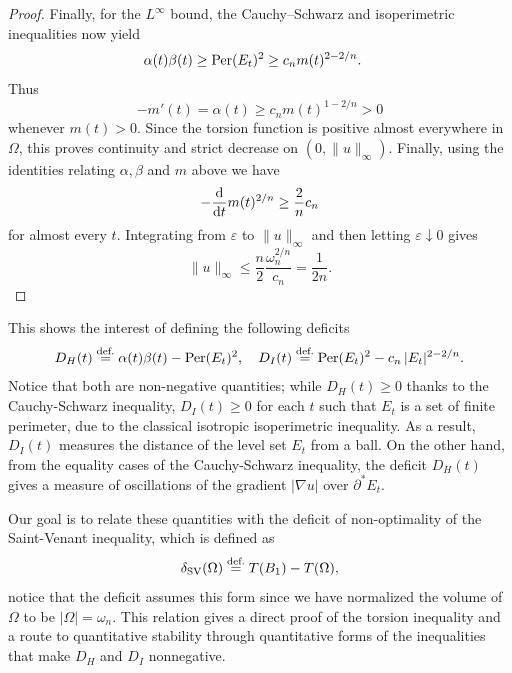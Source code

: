 \documentclass[11pt]{amsart}
\theoremstyle{plain}
\theoremstyle{definition}
\newcommand{\eqdef}{\overset{\text{def.}}{=}}
\def\dd{{\rm d}}
\newcommand\Per{\mathop{\rm Per}}
\newcommand\SV{\mathop{\rm SV}}
\begin{document}
\begin{proof}
Finally, for the $L^\infty$ bound, the Cauchy--Schwarz and isoperimetric inequalities now yield
\begin{align*}
  \alpha(t)\beta(t)
  &
  \ge\Per(E_t)^2
  \ge c_n m(t)^{2-2/n}.
\end{align*}
Thus
\[
  -m'(t)=\alpha(t)\ge c_n m(t)^{1-2/n}>0
\]
whenever $m(t)>0$. Since the torsion function is positive almost everywhere
in $\Omega$, this proves continuity and strict decrease on
$(0,\|u\|_\infty)$. Finally, using the identities relating $\alpha, \beta$ and $m$ above we have
\[
  -\frac{\dd}{\dd t}m(t)^{2/n}\ge\frac{2}{n} c_n
\]
for almost every $t$. Integrating from $\varepsilon$ to
$\|u\|_\infty$ and then letting $\varepsilon\downarrow0$ gives
\[
  \|u\|_\infty\le\frac{n}{2}\frac{\omega_n^{2/n}}{c_n}=\frac{1}{2n}.
\]
\end{proof}

This shows the interest of defining the following deficits
\begin{align}\label{eq.deficits_DH_DI}
  D_H(t)\eqdef \alpha(t)\beta(t)-\Per(E_t)^2,
  \quad
  D_I(t)\eqdef \Per(E_t)^2-c_n\,|E_t|^{2-2/n}.
\end{align}
Notice that both are non-negative quantities; while $D_H(t) \ge 0$ thanks to the Cauchy-Schwarz inequality, $D_I(t) \ge 0$ for each $t$ such that $E_t$ is a set of finite perimeter, due to the classical isotropic isoperimetric inequality. As a result, $D_I(t)$ measures the distance of the level set $E_t$ from a ball. On the other hand, from the equality cases of the Cauchy-Schwarz inequality, the deficit $D_H(t)$ gives a measure of oscillations of the gradient $|\nabla u|$ over $\partial^*E_t$.

Our goal is to relate these quantities with the deficit of non-optimality of the Saint-Venant inequality, which is defined as
\begin{equation}\label{eq.deficit_SaintVenant}
  \delta_{\SV}(\Omega)
  \eqdef T(B_1) - T(\Omega),
\end{equation}
notice that the deficit assumes this form since we have normalized the volume of $\Omega$ to be $|\Omega| = \omega_n$. 
This relation gives a direct proof of the torsion inequality and a route to
quantitative stability through quantitative forms of the inequalities that
make $D_H$ and $D_I$ nonnegative.
\end{document}
